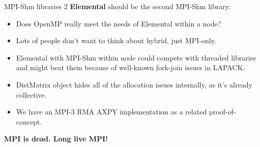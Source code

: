 \documentclass[11pt]{beamer}
\begin{document}
\begin{frame}{MPI-Shm libraries 2} \large
    \textbf{Elemental} should be the second MPI-Shm library:
    \begin{itemize}
        \item Does OpenMP really meet the needs of Elemental within a node?
        \item Lots of people don't want to think about hybrid, just MPI-only.
        \item Elemental with MPI-Shm within node could compete with threaded
              libraries and might beat them because of well-known fork-join
              issues in LAPACK.
        \item DistMatrix object hides all of the allocation issues internally,
              as it's already collective.
        \item We have an MPI-3 RMA AXPY implementation as a related proof-of-concept.
    \end{itemize}
\end{frame}

\begin{frame}{} \LARGE
  \begin{center}
      \textbf{MPI is dead.  Long live MPI!}
  \end{center}
\end{frame}

\end{document}
